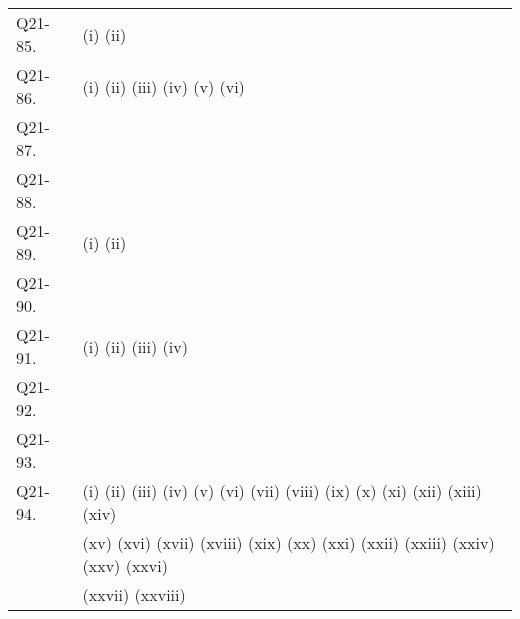 \documentclass[uplatex,dvipdfmx,a4paper,11pt]{jlreq}
\numberwithin{equation}{section}
\theoremstyle{definition}
\begin{document}
\begin{table}[hbtp]
\begin{tabular}{ll}
    Q21-85.  & (i) \quad (ii) \quad                                                                                                                                           \\
    Q21-86.  & (i) \quad (ii) \quad (iii) \quad (iv) \quad (v) \quad (vi) \quad                                                                                               \\
    Q21-87.  & \quad                                                                                                                                                          \\
    Q21-88.  & \quad                                                                                                                                                          \\
    Q21-89.  & (i) \quad (ii) \quad                                                                                                                                           \\
    Q21-90.  & \quad                                                                                                                                                          \\
    Q21-91.  & (i) \quad (ii) \quad (iii) \quad (iv) \quad                                                                                                                    \\
    Q21-92.  & \quad                                                                                                                                                          \\
    Q21-93.  & \quad                                                                                                                                                          \\
    Q21-94.  & (i) \quad (ii) \quad (iii) \quad (iv) \quad (v) \quad (vi) \quad (vii) \quad (viii) \quad (ix) \quad (x) \quad (xi) \quad (xii) \quad (xiii) \quad (xiv) \quad \\
             & (xv) \quad (xvi) \quad (xvii) \quad (xviii) \quad (xix) \quad (xx) \quad (xxi) \quad (xxii) \quad (xxiii) \quad (xxiv) \quad (xxv) \quad (xxvi) \quad          \\
             & (xxvii) \quad (xxviii) \quad                                                                                                                                   \\

\end{tabular}
\end{table}
\end{document}
